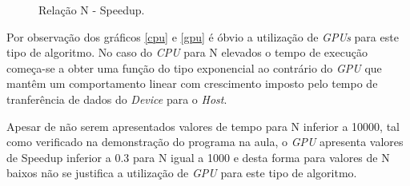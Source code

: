\begin{figure}[H]
	\begin{center}
		\caption{Relação N - Speedup.}
		\label{speedup}
	\end{center}
\end{figure}

Por observação dos gráficos \ref{cpu} e \ref{gpu} é óbvio a utilização de \textit{GPUs} para este tipo de algoritmo. No caso do \textit{CPU} para N elevados o tempo de execução começa-se a obter uma função do tipo exponencial ao contrário do \textit{GPU} que mantêm um comportamento linear com crescimento imposto pelo tempo de tranferência de dados do \textit{Device} para o \textit{Host}.

Apesar de não serem apresentados valores de tempo para N inferior a 10000, tal como verificado na demonstração do programa na aula, o \textit{GPU} apresenta valores de Speedup inferior a 0.3 para N igual a 1000 e desta forma para valores de N baixos não se justifica a utilização de \textit{GPU} para este tipo de algoritmo. 
